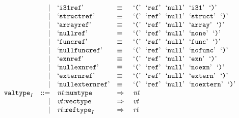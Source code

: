 $$\begin{array}[t]{@{}lrrl@{}l@{}l@{}l@{}}
& & | & \mbox{‘\texttt{i31ref}’} & \quad\equiv\quad{} & \mbox{‘\texttt{{(}}’}~~\mbox{‘\texttt{ref}’}~~\mbox{‘\texttt{null}’}~~\mbox{‘\texttt{i31}’}~~\mbox{‘\texttt{{)}}’} \\
& & | & \mbox{‘\texttt{structref}’} & \quad\equiv\quad{} & \mbox{‘\texttt{{(}}’}~~\mbox{‘\texttt{ref}’}~~\mbox{‘\texttt{null}’}~~\mbox{‘\texttt{struct}’}~~\mbox{‘\texttt{{)}}’} \\
& & | & \mbox{‘\texttt{arrayref}’} & \quad\equiv\quad{} & \mbox{‘\texttt{{(}}’}~~\mbox{‘\texttt{ref}’}~~\mbox{‘\texttt{null}’}~~\mbox{‘\texttt{array}’}~~\mbox{‘\texttt{{)}}’} \\
& & | & \mbox{‘\texttt{nullref}’} & \quad\equiv\quad{} & \mbox{‘\texttt{{(}}’}~~\mbox{‘\texttt{ref}’}~~\mbox{‘\texttt{null}’}~~\mbox{‘\texttt{none}’}~~\mbox{‘\texttt{{)}}’} \\
& & | & \mbox{‘\texttt{funcref}’} & \quad\equiv\quad{} & \mbox{‘\texttt{{(}}’}~~\mbox{‘\texttt{ref}’}~~\mbox{‘\texttt{null}’}~~\mbox{‘\texttt{func}’}~~\mbox{‘\texttt{{)}}’} \\
& & | & \mbox{‘\texttt{nullfuncref}’} & \quad\equiv\quad{} & \mbox{‘\texttt{{(}}’}~~\mbox{‘\texttt{ref}’}~~\mbox{‘\texttt{null}’}~~\mbox{‘\texttt{nofunc}’}~~\mbox{‘\texttt{{)}}’} \\
& & | & \mbox{‘\texttt{exnref}’} & \quad\equiv\quad{} & \mbox{‘\texttt{{(}}’}~~\mbox{‘\texttt{ref}’}~~\mbox{‘\texttt{null}’}~~\mbox{‘\texttt{exn}’}~~\mbox{‘\texttt{{)}}’} \\
& & | & \mbox{‘\texttt{nullexnref}’} & \quad\equiv\quad{} & \mbox{‘\texttt{{(}}’}~~\mbox{‘\texttt{ref}’}~~\mbox{‘\texttt{null}’}~~\mbox{‘\texttt{noexn}’}~~\mbox{‘\texttt{{)}}’} \\
& & | & \mbox{‘\texttt{externref}’} & \quad\equiv\quad{} & \mbox{‘\texttt{{(}}’}~~\mbox{‘\texttt{ref}’}~~\mbox{‘\texttt{null}’}~~\mbox{‘\texttt{extern}’}~~\mbox{‘\texttt{{)}}’} \\
& & | & \mbox{‘\texttt{nullexternref}’} & \quad\equiv\quad{} & \mbox{‘\texttt{{(}}’}~~\mbox{‘\texttt{ref}’}~~\mbox{‘\texttt{null}’}~~\mbox{‘\texttt{noextern}’}~~\mbox{‘\texttt{{)}}’} \\
& {{\mathtt{valtype}}}_{I} & ::= & {\mathit{nt}}{:}{\mathtt{numtype}} & \quad\Rightarrow\quad{} & {\mathit{nt}} \\
& & | & {\mathit{vt}}{:}{\mathtt{vectype}} & \quad\Rightarrow\quad{} & {\mathit{vt}} \\
& & | & {\mathit{rt}}{:}{{\mathtt{reftype}}}_{I} & \quad\Rightarrow\quad{} & {\mathit{rt}} \\
\end{array}
$$

